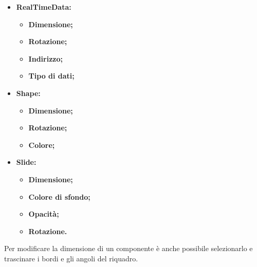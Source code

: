 \begin{itemize}
	\item \textbf{RealTimeData:}
		\begin{itemize}
			\item \textbf{Dimensione;}
			\item \textbf{Rotazione;}
			\item \textbf{Indirizzo;}
			\item \textbf{Tipo di dati;}
		\end{itemize}
		
	\item \textbf{Shape:}
		\begin{itemize}
			\item \textbf{Dimensione;}
			\item \textbf{Rotazione;}
			\item \textbf{Colore;}
		\end{itemize}
	
	\item \textbf{Slide:}
		\begin{itemize}
			\item \textbf{Dimensione;}
			\item \textbf{Colore di sfondo;}
			\item \textbf{Opacità;}
			\item \textbf{Rotazione.}
		\end{itemize}	
	
\end{itemize}

\noindent Per modificare la dimensione di un componente è anche possibile selezionarlo e trascinare i bordi e gli angoli del riquadro.